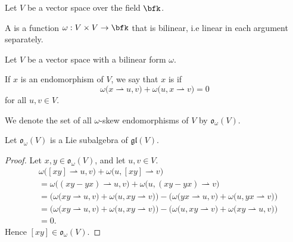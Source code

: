 \documentclass{article}
\newcommand{\lb}[1]{\ensuremath{\left[{#1}\right]}}
\newcommand*\glalg{\ensuremath{\mathfrak{gl}}}
\newcommand*\oalg{\ensuremath{\mathfrak{o}}}
\newcommand*\acts{\ensuremath{\rightharpoonup}}
\begin{document}
\begin{definition}
    Let $V$ be a vector space over the field $\bfk$.

    A  is a function $\omega: V \times V \to \bfk$ that is bilinear, i.e linear in each argument separately. 
\end{definition}

\begin{definition}
    Let $V$ be a vector space with a bilinear form $\omega$.

    If $x$ is an endomorphism of $V$, we say that $x$ is  if
    \[
        \omega\Big(x\acts u, v\Big)
        + \omega\Big(u,x \acts v\Big)
        =
        0
    \]
    for all $u, v \in V$.

    We denote the set of all $\omega$-skew endomorphisms of $V$ by $\oalg_\omega(V)$.
\end{definition}

\begin{theorem}
    Let $\oalg_\omega(V)$ is a Lie subalgebra of $\glalg(V)$.
\end{theorem}
\begin{proof}
    Let $x, y \in \oalg_\omega(V)$, and let $u, v \in V$.
    \begin{align*}
        &\omega\Big(
            \lb{xy} \acts u, v
        \Big)
        +
        \omega\Big(
            u, \lb{xy} \acts v
        \Big)
        \\
        &=
        \omega\Big(
            (xy - yx) \acts u, v
        \Big)
        +
        \omega\Big(
            u, (xy - yx) \acts v
        \Big)
        \\
        &=
        \bigg(
            \omega\Big(
                xy \acts u, v
            \Big)
            +
            \omega\Big(
                u, xy \acts v
            \Big)
        \bigg)
        -
        \bigg(
            \omega\Big(
                yx \acts u, v
            \Big)
            +
            \omega\Big(
                u, yx \acts v
            \Big)
        \bigg)
        \\
        &=
        \bigg(
            \omega\Big(
                xy \acts u, v
            \Big)
            +
            \omega\Big(
                u, xy \acts v
            \Big)
        \bigg)
        -
        \bigg(
            \omega\Big(
                u, xy \acts v
            \Big)
            +
            \omega\Big(
                xy \acts u, v
            \Big)
        \bigg)
        \\
        &=
        0.
    \end{align*}
    Hence $\lb{xy} \in \oalg_\omega(V)$.
\end{proof}
\end{document}
